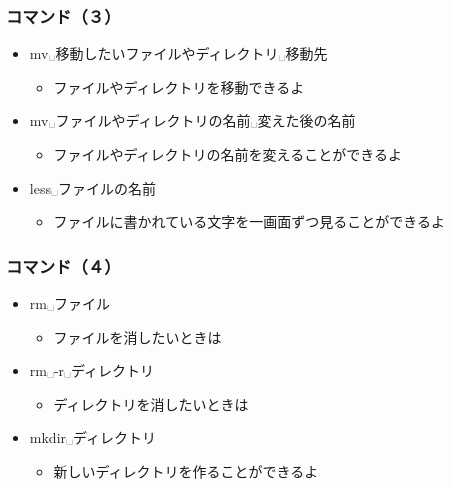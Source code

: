\begin{frame}
    \frametitle{コマンド（３）}
    \begin{itemize}
        \item mv␣移動したいファイルやディレクトリ␣移動先
        \begin{itemize}
            \item ファイルやディレクトリを移動できるよ
        \end{itemize}
        \item mv␣ファイルやディレクトリの名前␣変えた後の名前
        \begin{itemize}
            \item ファイルやディレクトリの名前を変えることができるよ
        \end{itemize}
        \item less␣ファイルの名前
        \begin{itemize}
            \item ファイルに書かれている文字を一画面ずつ見ることができるよ
        \end{itemize}
    \end{itemize}
\end{frame}

\begin{frame}
    \frametitle{コマンド（４）}
    \begin{itemize}
        \item rm␣ファイル
        \begin{itemize}
            \item ファイルを消したいときは
        \end{itemize}
        \item rm␣-r␣ディレクトリ
        \begin{itemize}
            \item ディレクトリを消したいときは
        \end{itemize}
        \item mkdir␣ディレクトリ
        \begin{itemize}
            \item 新しいディレクトリを作ることができるよ
        \end{itemize}
    \end{itemize}
    \begin{figure}[h]
        \centering
        
    \end{figure}
\end{frame}

